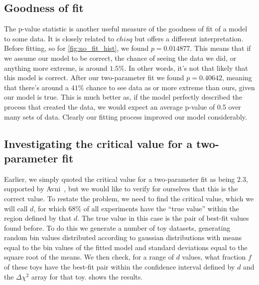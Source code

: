 \documentclass[11pt]{article}
\newcommand{\chisq}{\chi^2}
\numberwithin{equation}{section}
\numberwithin{figure}{section}
\numberwithin{table}{section}
\begin{document}
\subsection{Goodness of fit}
The p-value statistic is another useful measure of the goodness of fit of a model to some data. It is closely related to $chisq$ but offers a different interpretation. Before fitting, so for \cref{fig:no_fit_hist}, we found $p=0.014877$. This means that if we assume our model to be correct, the chance of seeing the data we did, or anything more extreme, is around $1.5\%$. In other words, it's not that likely that this model is correct. After our two-parameter fit we found $p=0.40642$, meaning that there's around a $41\%$ chance to see data as or more extreme than ours, given our model is true. This is much better as, if the model perfectly described the process that created the data, we would expect an average p-value of 0.5 over many sets of data. Clearly our fitting process improved our model considerably. 

\subsection{Investigating the critical value for a two-parameter fit}
Earlier, we simply quoted the critical value for a two-parameter fit as being 2.3, supported by Avni~\cite{XRay_energy_spectra}, but we would like to verify for ourselves that this is the correct value. To restate the problem, we need to find the critical value, which we will call $d$, for which $68\%$ of all experiments have the ``true value'' within the region defined by that $d$. The true value in this case is the pair of best-fit values found before. To do this we generate a number of toy datasets, generating random bin values distributed according to gaussian distributions with means equal to the bin values of the fitted model and standard deviations equal to the square root of the means. We then check, for a range of $d$ values, what fraction $f$ of these toys have the best-fit pair within the confidence interval defined by $d$ and the $\Delta\chisq$ array for that toy.  shows the results.
\end{document}
